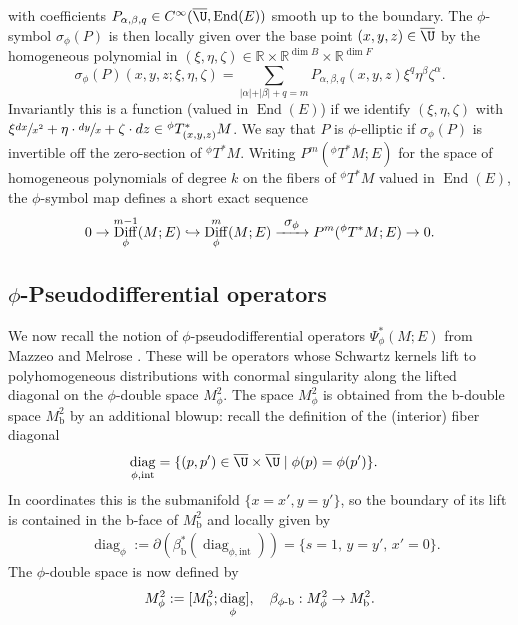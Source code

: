 \documentclass[JEP,XML,SOM,Unicode,NoFloatCountersInSection,published]{cedram}
\newcommand\hto{\mathrel{\lhook\joinrel\to}}
\newcommand\To[1]{\mathchoice{\xrightarrow{\textstyle\kern4pt#1\kern3pt}}{\stackrel{#1}{\longrightarrow}}{}{}}
\newcommand{\phib}{{\phi\textup{-}\bb}}
\theoremstyle{plain}
\theoremstyle{definition}
\newcommand{\R}{{\mathbb{R}}}
\newcommand{\bb}{{\mathrm{b}}}
\DeclareMathOperator\diag{diag}
\DeclareMathOperator{\Diff}{Diff}
\DeclareMathOperator{\End}{End}
\newcommand{\phiT}{{}^\phi T}
\begin{document}
with coefficients $P_{\alpha,\beta,q}\in C^\infty(\overline{\U},\End(E))$ smooth up to the boundary.
The $\phi$-symbol $\sigma_{\phi}(P)$ is then locally given
over the base point $(x,y,z) \in \overline{\U}$ by
the homogeneous polynomial in $(\xi, \eta, \zeta) \in \R\times\R^{\dim B}\times\R^{\dim F}$
\begin{equation}\label{phi-diff}
\sigma_{\phi}(P) (x,y,z; \xi, \eta, \zeta)= \sum_{\vert \alpha \vert + \vert \beta \vert + q = m}
P_{\alpha,\beta,q}(x,y,z)\xi^{q}\eta^\beta \zeta^{\alpha}.
\end{equation}
Invariantly this is a function (valued in $\End(E)$) if we identify $(\xi,\eta,\zeta)$ with $\xi\sfrac{dx}{x^2}+\eta\cdot\sfrac{dy}x+\zeta\cdot dz\in \phiT^{*}_{(x,y,z)}M$.
We say that $P$ is $\phi$-elliptic if $\sigma_{\phi}(P)$ is
invertible off the zero-section of $\phiT^{*}M$.
Writing $P^{m}(\phiT^{*}M; E)$ for the space of
homogeneous polynomials of degree $k$ on the fibers of $\phiT^{*}M$ valued in $\End(E)$, the
$\phi$-symbol map defines a short exact sequence
\begin{equation}
0 \to \Diff_{\phi}^{m-1}(M; E) \hto \Diff_{\phi}^{m}(M; E)
\To{\sigma_{\phi}} P^{m}(\phiT^{*}M; E) \to 0.
\end{equation}

\subsection{\texorpdfstring{$\phi$}{phi}-Pseudodifferential operators} \label{subsec:phi psido}
We now recall the notion of $\phi$-pseudodif\-ferential operators $\Psi^{*}_{\phi}(M; E)$ from
Mazzeo and Melrose \cite{mazzeo1998pseudodifferential}. These will be opera\-tors whose
Schwartz kernels lift to polyhomogeneous distributions with conormal singularity along
the lifted diagonal on the $\phi$-double space $M^2_\phi$. The space $M^2_\phi$ is obtained from
the b-double space $M^{2}_\bb$ by an additional blowup:
recall the definition of the (interior) fiber diagonal
\begin{align*}
&\diag_{\phi,\mathrm{int}} = \{ (p, p') \in \overline{\U} \times
\overline{\U}\mid \phi(p) = \phi(p')\}.
\end{align*}
In coordinates this is the submanifold $\{x=x', y=y'\}$, so the boundary of its lift is contained in the b-face of $M^2_\bb$ and locally given by
\begin{align*}
&\diag_\phi :=
\partial(\beta_\bb^*(\diag_{\phi,\mathrm{int}})) = \{s=1,\,y = y',\,x'=0\}.
\end{align*}
The $\phi$-double space is now defined by
\begin{equation}\label{phi-double}
M_{\phi}^{2} := [M^{2}_\bb; \diag_\phi],\quad \beta_{\phib}:M_\phi^2\to M_\bb^2.
\end{equation}
\end{document}
